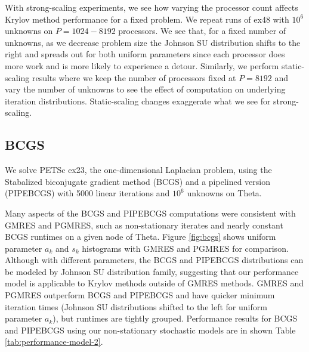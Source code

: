\documentclass[num-refs]{wiley-article}
\begin{document}
With strong-scaling experiments, we see how varying the processor count affects Krylov method performance for a fixed problem. We repeat runs of ex48 with  $10^6$ unknowns on $P = 1024 - 8192$ processors. 
We see that, for a fixed number of unknowns, as we decrease problem size the Johnson SU distribution shifts to the right and spreads out for both uniform parameters since each processor does more work and is more likely to experience a detour. 
Similarly, we perform static-scaling results where we keep the number of processors fixed at $P=8192$ and vary the number of unknowns to see the effect of computation on underlying iteration distributions.
Static-scaling changes exaggerate what we see for strong-scaling.


\subsection{BCGS}\label{sec:bcgs}

We solve PETSc ex23, the one-dimensional Laplacian problem, using the Stabalized biconjugate gradient method (BCGS) and a pipelined version (PIPEBCGS) with 5000 linear iterations and $10^6$ unknowns on Theta.  

Many aspects of the BCGS and PIPEBCGS computations were consistent with GMRES and PGMRES, such as non-stationary iterates and nearly constant BCGS runtimes on a given node of Theta. 
Figure \ref{fig:bcgs} shows uniform parameter $a_k$ and $s_k$ histograms with GMRES and PGMRES for comparison. 
Although with different parameters, the BCGS and PIPEBCGS distributions can be modeled by Johnson SU distribution family, 
suggesting that our performance model is applicable to Krylov methods outside of GMRES methods.
GMRES and PGMRES outperform BCGS and PIPEBCGS and have quicker minimum iteration times (Johnson SU distributions shifted to the left for uniform parameter $a_k$), but runtimes are  tightly grouped.
Performance results for BCGS and PIPEBCGS using our non-stationary stochastic models are in shown Table \ref{tab:performance-model-2}.
\end{document}
